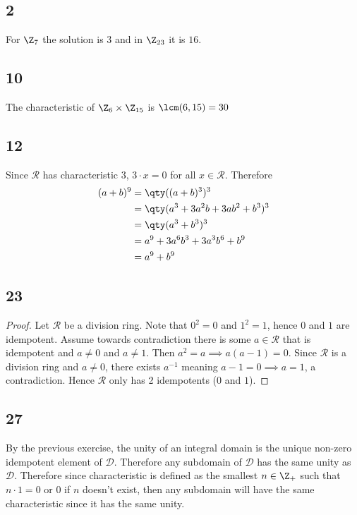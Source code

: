 \documentclass[12pt,titlepage]{extarticle}
\begin{document}

\subsection*{2}
For $\Z_7$ the solution is $3$ and in $\Z_{23}$ it is $16$.

\subsection*{10}
The characteristic of $\Z_6 \times \Z_{15}$ is $\lcm(6,15) = 30$

\subsection*{12}
Since $\mathcal{R}$ has characteristic $3$, $3\cdot x = 0$ for all $x \in \mathcal{R}$. Therefore
\begin{align*}
    (a+b)^9 &= \qty((a+b)^3)^3 \\
    &= \qty(a^3 + 3a^2 b + 3ab^2 + b^3)^3 \\
    &= \qty(a^3 + b^3)^3 \\
    &= a^9 + 3a^6 b^3 + 3a^3 b^6 + b^9 \\
    &= a^9 + b^9
\end{align*}

\subsection*{23}
\begin{proof}
    Let $\mathcal{R}$ be a division ring. Note that $0^2 = 0$ and $1^2 = 1$, hence $0$ and $1$ are idempotent. Assume towards contradiction there is some $a \in \mathcal{R}$ that is idempotent and $a \neq 0$ and $a \neq 1$. Then $a^2 = a \implies a(a-1) = 0$. Since $\mathcal{R}$ is a division ring and $a \neq 0$, there exists $a^{-1}$ meaning $a - 1 = 0 \implies a = 1$, a contradiction. Hence $\mathcal{R}$ only has 2 idempotents ($0$ and $1$).
\end{proof}

\subsection*{27}
By the previous exercise, the unity of an integral domain is the unique non-zero idempotent element of $\mathcal{D}$. Therefore any subdomain of $\mathcal{D}$ has the same unity as $\mathcal{D}$. Therefore since characteristic is defined as the smallest $n \in \Z_+$ such that $n \cdot 1 = 0$ or $0$ if $n$ doesn't exist, then any subdomain will have the same characteristic since it has the same unity.
\end{document}

